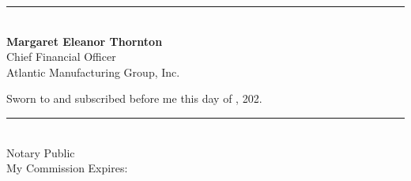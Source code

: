 \documentclass[
    language=english,
    doctype=affidavit,
    institution=none,
]{../../omnilatex}
\begin{document}
\noindent\rule{5cm}{0.4pt}\\
\textbf{Margaret Eleanor Thornton}\\
Chief Financial Officer\\
Atlantic Manufacturing Group, Inc.

\vspace{1cm}

\noindent Sworn to and subscribed before me this \underline{\hspace{2cm}} day of \underline{\hspace{3cm}}, 202\underline{\hspace{0.5cm}}.

\vspace{2cm}

\noindent\rule{5cm}{0.4pt}\\
Notary Public\\
My Commission Expires: \underline{\hspace{3cm}}

\vspace{0.5cm}

\end{document}
